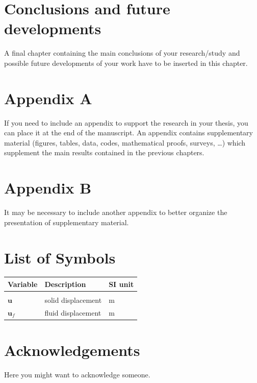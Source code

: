 \documentclass{Configuration_Files/PoliMi3i_thesis}
\begin{document}
\chapter{Conclusions and future developments}
\label{ch:conclusions}%
A final chapter containing the main conclusions of your research/study
and possible future developments of your work have to be inserted in this chapter.




\cleardoublepage
{} %
\appendix
\chapter{Appendix A}
If you need to include an appendix to support the research in your thesis, you can place it at the end of the manuscript.
An appendix contains supplementary material (figures, tables, data, codes, mathematical proofs, surveys, \dots)
which supplement the main results contained in the previous chapters.

\chapter{Appendix B}
It may be necessary to include another appendix to better organize the presentation of supplementary material.

\listoffigures

\listoftables

\chapter*{List of Symbols} %
\begin{table}[H]
	\centering
	\begin{tabular}{lll}
		\textbf{Variable} & \textbf{Description} & \textbf{SI unit} \\\hline\\[-9px]
		$\bm{u}$          & solid displacement   & m                \\[2px]
		$\bm{u}_f$        & fluid displacement   & m                \\[2px]
	\end{tabular}
\end{table}

\chapter*{Acknowledgements}
Here you might want to acknowledge someone.

\cleardoublepage
\end{document}
